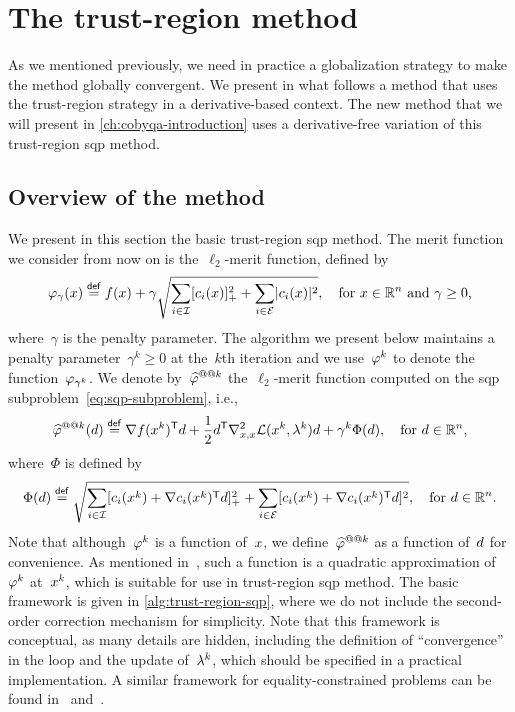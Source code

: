 \section{The trust-region  method}
\label{sec:sqp-trust-region}

As we mentioned previously, we need in practice a globalization strategy to make the method globally convergent.
We present in what follows a method that uses the trust-region strategy in a derivative-based context.
The new method that we will present in \cref{ch:cobyqa-introduction} uses a derivative-free variation of this trust-region \gls{sqp} method.

\subsection{Overview of the method}

We present in this section the basic trust-region \gls{sqp} method.
The merit function we consider from now on is the~$\ell_2$-merit function, defined by
\begin{equation*}
    \merit_{\gamma}(\iter) \eqdef \obj(\iter) + \gamma \sqrt{\sum_{i \in \iub} \posp{\con{i}(\iter)}^2 + \sum_{i \in \ieq} \abs{\con{i}(\iter)}^2}, \quad \text{for~$\iter \in \R^n$ and~$\gamma \ge 0$,}
\end{equation*}
where~$\gamma$ is the penalty parameter.
The algorithm we present below maintains a penalty parameter~$\gamma^k \ge 0$ at the~$k$th iteration and we use~$\merit[k]$ to denote the function~$\merit_{\gamma^k}$.
We denote by~$\meritm[k]$ the~$\ell_2$-merit function computed on the \gls{sqp} subproblem~\cref{eq:sqp-subproblem}, i.e.,
\begin{equation*}
    \meritm[k](\step) \eqdef \nabla \obj(\iter[k])^{\T} \step + \frac{1}{2} \step^{\T} \nabla_{x, x}^2 \lag(\iter[k], \lm[k]) \step + \gamma^k \Phi(\step), \quad \text{for~$\step \in \R^n$,}
\end{equation*}
where~$\Phi$ is defined by
\begin{equation*}
    \Phi(\step) \eqdef \sqrt{\sum_{i \in \iub} \posp{\con{i}(\iter[k]) + \nabla \con{i}(\iter[k])^{\T} \step}^2 + \sum_{i \in \ieq} [\con{i}(\iter[k]) + \nabla \con{i}(\iter[k])^{\T} \step]^2}, \quad \text{for~$\step \in \R^n$.}
\end{equation*}
Note that although~$\merit[k]$ is a function of~$\iter$, we define~$\meritm[k]$ as a function of~$\step$ for convenience.
As mentioned in~\cite[\S~15.3.2.1]{Conn_Gould_Toint_2000}, such a function is a quadratic approximation of~$\merit[k]$ at~$\iter[k]$, which is suitable for use in trust-region \gls{sqp} method.
The basic framework is given in \cref{alg:trust-region-sqp}, where we do not include the second-order correction mechanism for simplicity.
Note that this framework is conceptual, as many details are hidden, including the definition of \enquote{convergence} in the loop and the update of~$\lm[k]$, which should be specified in a practical implementation.
A similar framework for equality-constrained problems can be found in~\cite[\S~2]{Powell_Yuan_1991} and~\cite[Alg.~18.4]{Nocedal_Wright_2006}.

